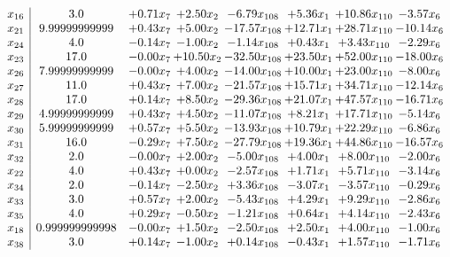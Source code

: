\documentclass[8pt]{article}
\begin{document}
\[\begin{array}{c| c c@{\hskip 2pt} c@{\hskip 2pt} c@{\hskip 2pt} c@{\hskip 2pt} c@{\hskip 2pt} c@{\hskip 2pt} }
 x_{16}   &  3.0 & +  0.71 x_{7} & +  2.50 x_{2} & -6.79 x_{108} & +  5.36 x_{1} & + 10.86 x_{110} & -3.57 x_{6}\\
 x_{21}   &  9.99999999999 & +  0.43 x_{7} & +  5.00 x_{2} & -17.57 x_{108} & + 12.71 x_{1} & + 28.71 x_{110} & -10.14 x_{6}\\
 x_{24}   &  4.0 & -0.14 x_{7} & -1.00 x_{2} & -1.14 x_{108} & +  0.43 x_{1} & +  3.43 x_{110} & -2.29 x_{6}\\
 x_{23}   &  17.0 & -0.00 x_{7} & + 10.50 x_{2} & -32.50 x_{108} & + 23.50 x_{1} & + 52.00 x_{110} & -18.00 x_{6}\\
 x_{26}   &  7.99999999999 & -0.00 x_{7} & +  4.00 x_{2} & -14.00 x_{108} & + 10.00 x_{1} & + 23.00 x_{110} & -8.00 x_{6}\\
 x_{27}   &  11.0 & +  0.43 x_{7} & +  7.00 x_{2} & -21.57 x_{108} & + 15.71 x_{1} & + 34.71 x_{110} & -12.14 x_{6}\\
 x_{28}   &  17.0 & +  0.14 x_{7} & +  8.50 x_{2} & -29.36 x_{108} & + 21.07 x_{1} & + 47.57 x_{110} & -16.71 x_{6}\\
 x_{29}   &  4.99999999999 & +  0.43 x_{7} & +  4.50 x_{2} & -11.07 x_{108} & +  8.21 x_{1} & + 17.71 x_{110} & -5.14 x_{6}\\
 x_{30}   &  5.99999999999 & +  0.57 x_{7} & +  5.50 x_{2} & -13.93 x_{108} & + 10.79 x_{1} & + 22.29 x_{110} & -6.86 x_{6}\\
 x_{31}   &  16.0 & -0.29 x_{7} & +  7.50 x_{2} & -27.79 x_{108} & + 19.36 x_{1} & + 44.86 x_{110} & -16.57 x_{6}\\
 x_{32}   &  2.0 & -0.00 x_{7} & +  2.00 x_{2} & -5.00 x_{108} & +  4.00 x_{1} & +  8.00 x_{110} & -2.00 x_{6}\\
 x_{22}   &  4.0 & +  0.43 x_{7} & +  0.00 x_{2} & -2.57 x_{108} & +  1.71 x_{1} & +  5.71 x_{110} & -3.14 x_{6}\\
 x_{34}   &  2.0 & -0.14 x_{7} & -2.50 x_{2} & +  3.36 x_{108} & -3.07 x_{1} & -3.57 x_{110} & -0.29 x_{6}\\
 x_{33}   &  3.0 & +  0.57 x_{7} & +  2.00 x_{2} & -5.43 x_{108} & +  4.29 x_{1} & +  9.29 x_{110} & -2.86 x_{6}\\
 x_{35}   &  4.0 & +  0.29 x_{7} & -0.50 x_{2} & -1.21 x_{108} & +  0.64 x_{1} & +  4.14 x_{110} & -2.43 x_{6}\\
 x_{18}   &  0.999999999998 & -0.00 x_{7} & +  1.50 x_{2} & -2.50 x_{108} & +  2.50 x_{1} & +  4.00 x_{110} & -1.00 x_{6}\\
 x_{38}   &  3.0 & +  0.14 x_{7} & -1.00 x_{2} & +  0.14 x_{108} & -0.43 x_{1} & +  1.57 x_{110} & -1.71 x_{6}\\

\end{array}\]
\end{document}
